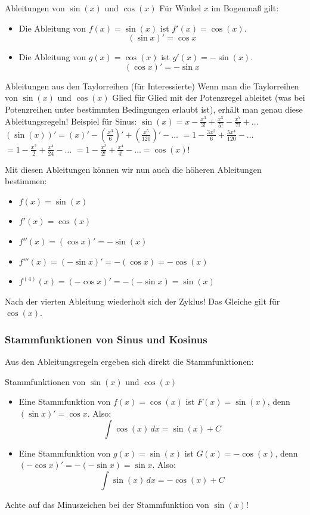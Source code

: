 \begin{merksatzumgebung}{Ableitungen von $\sin(x)$ und $\cos(x)$}
Für Winkel $x$ im Bogenmaß gilt:
\begin{itemize}
    \item Die Ableitung von $f(x) = \sin(x)$ ist $f'(x) = \cos(x)$.
    \[ (\sin x)' = \cos x \]
    \item Die Ableitung von $g(x) = \cos(x)$ ist $g'(x) = -\sin(x)$.
    \[ (\cos x)' = -\sin x \]
\end{itemize}
\end{merksatzumgebung}

\begin{tippumgebung}{Ableitungen aus den Taylorreihen (für Interessierte)}
Wenn man die Taylorreihen von $\sin(x)$ und $\cos(x)$ Glied für Glied mit der Potenzregel ableitet (was bei Potenzreihen unter bestimmten Bedingungen erlaubt ist), erhält man genau diese Ableitungsregeln!
Beispiel für Sinus:
$\sin(x) = x - \frac{x^3}{3!} + \frac{x^5}{5!} - \frac{x^7}{7!} + \dots$
$(\sin(x))' = (x)' - (\frac{x^3}{6})' + (\frac{x^5}{120})' - \dots$
$= 1 - \frac{3x^2}{6} + \frac{5x^4}{120} - \dots$
$= 1 - \frac{x^2}{2} + \frac{x^4}{24} - \dots$
$= 1 - \frac{x^2}{2!} + \frac{x^4}{4!} - \dots = \cos(x)$!
\end{tippumgebung}

Mit diesen Ableitungen können wir nun auch die höheren Ableitungen bestimmen:
\begin{itemize}
    \item $f(x) = \sin(x)$
    \item $f'(x) = \cos(x)$
    \item $f''(x) = (\cos x)' = -\sin(x)$
    \item $f'''(x) = (-\sin x)' = -(\cos x) = -\cos(x)$
    \item $f^{(4)}(x) = (-\cos x)' = -(-\sin x) = \sin(x)$
\end{itemize}
Nach der vierten Ableitung wiederholt sich der Zyklus! Das Gleiche gilt für $\cos(x)$.

\subsubsection{Stammfunktionen von Sinus und Kosinus}
Aus den Ableitungsregeln ergeben sich direkt die Stammfunktionen:

\begin{merksatzumgebung}{Stammfunktionen von $\sin(x)$ und $\cos(x)$}
\begin{itemize}
    \item Eine Stammfunktion von $f(x) = \cos(x)$ ist $F(x) = \sin(x)$, denn $(\sin x)' = \cos x$.
    Also: \[\int \cos(x) \,dx = \sin(x) + C \]
    \item Eine Stammfunktion von $g(x) = \sin(x)$ ist $G(x) = -\cos(x)$, denn $(-\cos x)' = -(-\sin x) = \sin x$.
    Also: \[\int \sin(x) \,dx = -\cos(x) + C \]
\end{itemize}
Achte auf das Minuszeichen bei der Stammfunktion von $\sin(x)$!
\end{merksatzumgebung}

